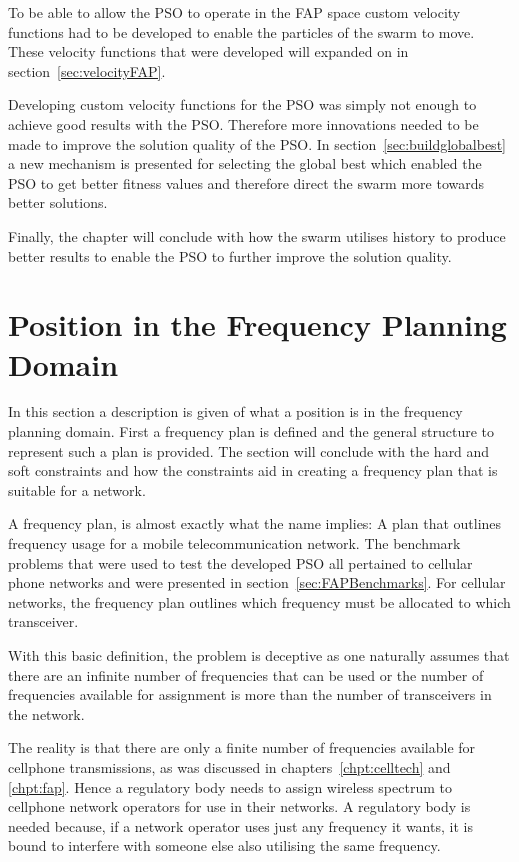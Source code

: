 To be able to allow the PSO to operate in the FAP space custom velocity functions had to be developed to enable the particles of the swarm to move. These velocity functions that were developed will expanded on in section~\ref{sec:velocityFAP}. 

Developing custom velocity functions for the PSO was simply not enough to achieve good results with the PSO. Therefore more innovations needed to be made to improve the solution quality of the PSO. In section~\ref{sec:buildglobalbest} a new mechanism is presented for selecting the global best which enabled the PSO to get better fitness values and therefore direct the swarm more towards better solutions. 

Finally, the chapter will conclude with how the swarm utilises history to produce better results to enable the PSO to further improve the solution quality.
\section{Position in the Frequency Planning Domain}
In this section a description is given of what a position is in the frequency planning domain. First a frequency plan is defined and the general structure to represent such a plan is provided. The section will conclude with the hard and soft constraints and how the constraints aid in creating a frequency plan that is suitable for a network.

A frequency plan, is almost exactly what the name implies: A plan that outlines frequency usage for a mobile telecommunication network. The benchmark problems that were used to test the developed PSO all pertained to cellular phone networks and were presented in section~\ref{sec:FAPBenchmarks}. For cellular networks, the frequency plan outlines which frequency must be allocated to which transceiver.

With this basic definition, the problem is deceptive as one naturally assumes that there are an infinite number of frequencies that can be used or the number of frequencies available for assignment is more than the number of transceivers in the network. 

The reality is that there are only a finite number of frequencies available for cellphone transmissions, as was discussed in chapters~\ref{chpt:celltech} and \ref{chpt:fap}. Hence a regulatory body needs to assign wireless spectrum to cellphone network operators for use in their networks. A regulatory body is needed because, if a network operator uses just any frequency it wants, it is bound to interfere with someone else also utilising the same frequency.

